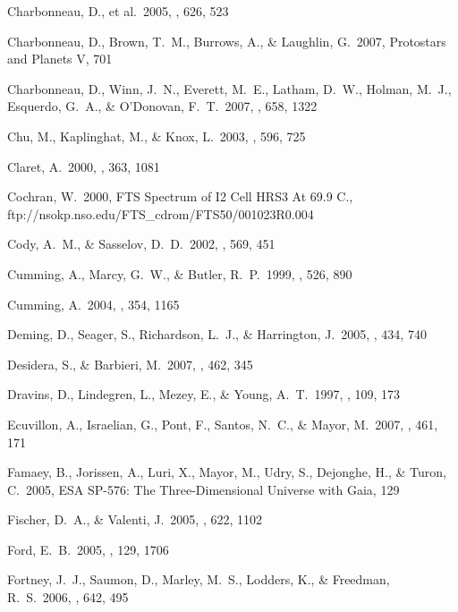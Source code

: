\documentclass{emulateapj}
\begin{document}
\begin{thebibliography}
 Charbonneau, D., et 
al.\ 2005, \apj, 626, 523 

 Charbonneau, D., 
Brown, T.~M., Burrows, A., \& Laughlin, G.\ 2007, Protostars and Planets V, 
701 

 Charbonneau, D., 
Winn, J.~N., Everett, M.~E., Latham, D.~W., Holman, M.~J., Esquerdo, G.~A., 
\& O'Donovan, F.~T.\ 2007, \apj, 658, 1322 

 Chu, M., Kaplinghat, M., \& 
Knox, L.\ 2003, \apj, 596, 725 

 Claret, A.\ 2000, \aap, 363, 
1081 

 Cochran, W.\ 2000, FTS Spectrum of I2 Cell HRS3 At 69.9 C., ftp://nsokp.nso.edu/FTS\_cdrom/FTS50/001023R0.004

 Cody, A.~M., \& 
Sasselov, D.~D.\ 2002, \apj, 569, 451 


 Cumming, A., Marcy, 
G.~W., \& Butler, R.~P.\ 1999, \apj, 526, 890 

 Cumming, A.\ 2004, \mnras, 
354, 1165 

 Deming, D., Seager, S., 
Richardson, L.~J., \& Harrington, J.\ 2005, \nat, 434, 740 

 Desidera, S., \& 
Barbieri, M.\ 2007, \aap, 462, 345 

 Dravins, D., Lindegren, 
L., Mezey, E., \& Young, A.~T.\ 1997, \pasp, 109, 173

 Ecuvillon, A., 
Israelian, G., Pont, F., Santos, N.~C., \& Mayor, M.\ 2007, \aap, 461, 171 

 Famaey, B., Jorissen, 
A., Luri, X., Mayor, M., Udry, S., Dejonghe, H., \& Turon, C.\ 2005, ESA 
SP-576: The Three-Dimensional Universe with Gaia, 129 

 Fischer, D.~A., \& 
Valenti, J.\ 2005, \apj, 622, 1102 

 Ford, E.~B.\ 2005, \aj, 129, 1706 

 Fortney, J.~J., Saumon, 
D., Marley, M.~S., Lodders, K., \& Freedman, R.~S.\ 2006, \apj, 642, 495 


\end{thebibliography}
\end{document}
